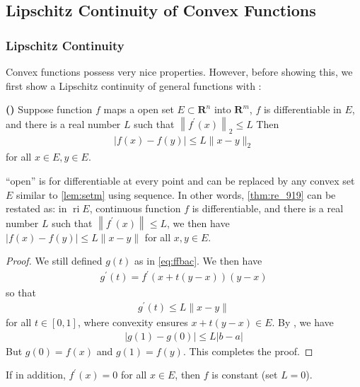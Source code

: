 \documentclass{article}
\newcommand{\bfs}[1]{\textbf{({#1}) }}
\newcommand{\ri}{\operatorname{ri}}
\begin{document}
\subsection{Lipschitz Continuity of Convex Functions}
\subsubsection{Lipschitz Continuity}
Convex functions possess very nice  properties. However, before showing this, we first show a  Lipschitz continuity of general  functions with :
\begin{thma}\bfs{\cite[Theorem 9.19]{rudin1976principles}}\label{thm:re_919}
Suppose  function $f$ maps a  open set $E \subset \mathbf{R}^{n}$ into $\mathbf{R}^{m}$, $f$ is differentiable in $E$, and there is a real number $L$ such that $\left\|{f}^{\prime}({x})\right\|_2 \leq L$
Then
\begin{align*}
|f(x)-f(y)| \leq L\|x-y\|_2
\end{align*}
for all $x\in E, y\in E .$
\end{thma}
\begin{rema}
``open'' is for differentiable at every point and can be replaced by any convex set $E$ similar to \cref{lem:setm} using sequence. In other words, \cref{thm:re_919} can be restated as:  in $\ri E$, continuous function $f$ is differentiable, and there is a real number $L$ such that $\left\|{f}^{\prime}({x})\right\| \leq L$, we then have $|f(x)-f(y)| \leq L\|x-y\|$ for all $x,y\in E$.
\end{rema}
\begin{proof}\color{ForestGreen}
We still defined $g(t)$ as in \cref{eq:ffbac}. We then have
\begin{align*}
g^{\prime}(t)=f^{\prime}(x+t(y-x))(y-x) 
\end{align*}
so that 
\begin{align*}
g^{\prime}(t)\leq L\|x-y\|
\end{align*}
for all $t \in[0,1]$, where convexity ensures $x+t(y-x)\in E$. By \cite[Theorem 5.19]{rudin1976principles}, we have
\begin{align*}
|{g}(1)-{g}(0)| \leq L|b-a|
\end{align*}
But ${g}(0)={f}(x)$ and ${g}(1)={f}(y)$. This completes the proof.
\end{proof}
\begin{cora}
If in addition, ${f}^{\prime}({x})={0}$ for all ${x} \in E$, then ${f}$ is constant (set $L=0$).
\end{cora}
\end{document}
